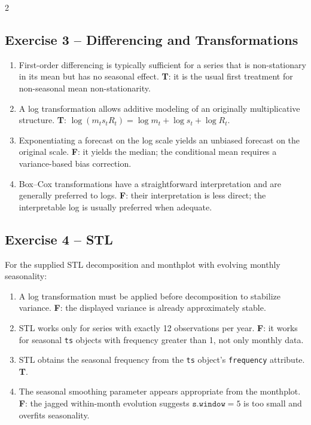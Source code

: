 \documentclass[9pt,a4paper]{extarticle}
\begin{document}
\begin{multicols}{2}
\subsection*{Exercise 3 -- Differencing and Transformations}
\begin{enumerate}[label=\alph*),leftmargin=4mm]
\item First-order differencing is typically sufficient for a series that is non-stationary in its mean but has no seasonal effect. \textbf{T}: it is the usual first treatment for non-seasonal mean non-stationarity.
\item A log transformation allows additive modeling of an originally multiplicative structure. \textbf{T}: \(\log(m_ts_tR_t)=\log m_t+\log s_t+\log R_t\).
\item Exponentiating a forecast on the log scale yields an unbiased forecast on the original scale. \textbf{F}: it yields the median; the conditional mean requires a variance-based bias correction.
\item Box--Cox transformations have a straightforward interpretation and are generally preferred to logs. \textbf{F}: their interpretation is less direct; the interpretable log is usually preferred when adequate.
\end{enumerate}

\subsection*{Exercise 4 -- STL}
For the supplied STL decomposition and monthplot with evolving monthly seasonality:
\begin{enumerate}[label=\alph*),leftmargin=4mm]
\item A log transformation must be applied before decomposition to stabilize variance. \textbf{F}: the displayed variance is already approximately stable.
\item STL works only for series with exactly 12 observations per year. \textbf{F}: it works for seasonal \texttt{ts} objects with frequency greater than 1, not only monthly data.
\item STL obtains the seasonal frequency from the \texttt{ts} object's \texttt{frequency} attribute. \textbf{T}.
\item The seasonal smoothing parameter appears appropriate from the monthplot. \textbf{F}: the jagged within-month evolution suggests \(\texttt{s.window}=5\) is too small and overfits seasonality.
\end{enumerate}


\end{multicols}
\end{document}
